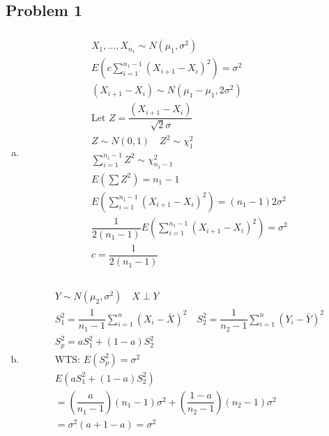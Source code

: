 \documentclass{article}
\newcommand{\sg}{\sigma}
\newcommand{\sumn}{\sum_{i=1}^{n}}
\begin{document}
\begin{flushleft}

	\section*{Problem 1}
	
\begin{enumerate}[(a)]
	
	\item 
\begin{multline*}\\
X_1,\dots, X_{n_1} \sim N(\mu_1,\sigma^2)\\
E(c\sum_{i=1}^{n_1-1}(X_{i+1}-X_i)^2)=\sg^2\\
(X_{i+1}-X_i)\sim N(\mu_1-\mu_1,2\sigma^2)\\
\text{Let } Z=\dfrac{(X_{i+1}-X_i)}{\sqrt{2}\sigma}\\
Z\sim N(0,1) \quad Z^2\sim \chi^2_{1}\\
\sum_{i=1}^{n_1-1}Z^2\sim \chi^2_{n_1-1}\\
E(\sum Z^2)=n_1-1\\
E(\sum_{i=1}^{n_1-1}(X_{i+1}-X_i)^2)=(n_1-1)2\sg^2\\
\dfrac{1}{2(n_1-1)}E(\sum_{i=1}^{n_1-1}(X_{i+1}-X_i)^2)=\sg^2\\
c=\dfrac{1}{2(n_1-1)}\\
\end{multline*}

	\item 
\begin{multline*}\\
Y\sim N(\mu_2,\sg^2) \quad X\perp Y\\
S_1^2=\dfrac{1}{n_1-1}\sumn(X_i-\bar{X})^2\quad S_2^2=\dfrac{1}{n_2-1}\sumn(Y_i-\bar{Y})^2\\
S_p^2=aS_1^2+(1-a)S_2^2\\
\text{WTS: } E(S_p^2)=\sg^2\\
E(aS_1^2+(1-a)S_2^2)\\
=\left(\dfrac{a}{n_1-1}\right)(n_1-1)\sg^2+\left(\dfrac{1-a}{n_2-1}\right)(n_2-1)\sg^2\\
=\sg^2(a+1-a)=\sg^2\\
\end{multline*}


\end{enumerate}
\end{flushleft}
\end{document}
